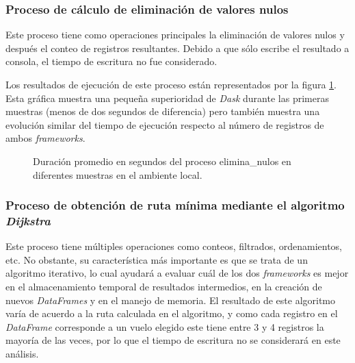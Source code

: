 \subsubsection{Proceso de cálculo de eliminación de valores nulos}

Este proceso tiene como operaciones principales la eliminación de valores nulos y después el conteo de registros resultantes. Debido a que sólo escribe el resultado a consola, el tiempo de escritura no fue considerado.

Los resultados de ejecución de este proceso están representados por la figura \ref{lineas:local-elimina-nulos}. Esta gráfica muestra una pequeña superioridad de \textit{Dask} durante las primeras muestras (menos de dos segundos de diferencia) pero también muestra una evolución similar del tiempo de ejecución respecto al número de registros de ambos \textit{frameworks}. 

\begin{figure}
\centering
{}
\caption{Duración promedio en segundos del proceso elimina\_nulos en diferentes muestras en el ambiente local.}
\label{lineas:local-elimina-nulos}
\end{figure}

\subsubsection{Proceso de obtención de ruta mínima mediante el algoritmo \textit{Dijkstra}}

Este proceso tiene múltiples operaciones como conteos, filtrados, ordenamientos, etc. No obstante, su característica más importante es que se trata de un algoritmo iterativo, lo cual ayudará a evaluar cuál de los dos \textit{frameworks} es mejor en el almacenamiento temporal de resultados intermedios, en la creación de nuevos \textit{DataFrames} y en el manejo de memoria. El resultado de este algoritmo varía de acuerdo a la ruta calculada en el algoritmo, y como cada registro en el \textit{DataFrame} corresponde a un vuelo elegido este tiene entre 3 y 4 registros la mayoría de las veces, por lo que el tiempo de escritura no se considerará en este análisis.

